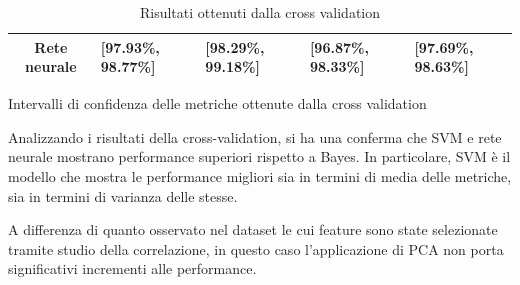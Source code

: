 \begin{table}[!ht]
\begin{subtable}[h]{1\textwidth}
\begin{tabular}{@{}cllll@{}}
            \cellcolor[HTML]{EFEFEF}\textbf{Rete neurale}         & [97.93\%, 98.77\%]   & [98.29\%, 99.18\%]  & [96.87\%, 98.33\%] & [97.69\%, 98.63\%] \\ \bottomrule
        \end{tabular}
        \caption{Intervalli di confidenza delle metriche ottenute dalla cross validation}
        \label{tab:intervalli_confidenza_pca}
    \end{subtable}
    \caption{Risultati ottenuti dalla cross validation}
    \label{tab:media_intervalli_confidenza_pca}
\end{table}

Analizzando i risultati della cross-validation, si ha una conferma che SVM e
rete neurale mostrano performance superiori rispetto a Bayes. In particolare,
SVM è il modello che mostra le performance migliori sia in termini di media delle
metriche, sia in termini di varianza delle stesse.

A differenza di quanto osservato nel dataset le cui feature sono state selezionate
tramite studio della correlazione, in questo caso l'applicazione di PCA non
porta significativi incrementi alle performance.

